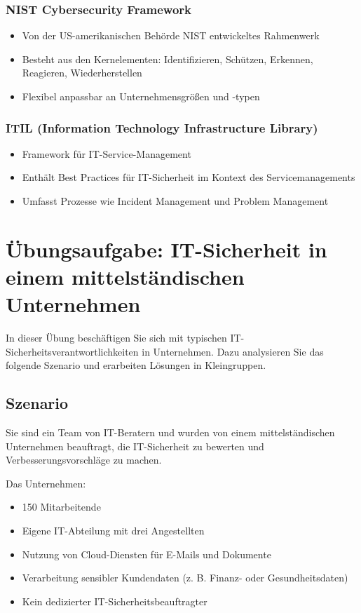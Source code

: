 \documentclass{orgstandard}
\begin{document}
\subsubsection{NIST Cybersecurity Framework}
\label{sec:orgc2ca827}
\begin{itemize}
\item Von der US-amerikanischen Behörde NIST entwickeltes Rahmenwerk
\item Besteht aus den Kernelementen: Identifizieren, Schützen, Erkennen, Reagieren, Wiederherstellen
\item Flexibel anpassbar an Unternehmensgrößen und -typen
\end{itemize}
\subsubsection{ITIL (Information Technology Infrastructure Library)}
\label{sec:org27d10a5}
\begin{itemize}
\item Framework für IT-Service-Management
\item Enthält Best Practices für IT-Sicherheit im Kontext des Servicemanagements
\item Umfasst Prozesse wie Incident Management und Problem Management
\end{itemize}
\section{Übungsaufgabe: IT-Sicherheit in einem mittelständischen Unternehmen}
\label{sec:orgc2ade00}
In dieser Übung beschäftigen Sie sich mit typischen IT-Sicherheitsverantwortlichkeiten in Unternehmen. 
Dazu analysieren Sie das folgende Szenario und erarbeiten Lösungen in Kleingruppen.
\subsection{Szenario}
\label{sec:org21960e6}

Sie sind ein Team von IT-Beratern und wurden von einem mittelständischen Unternehmen beauftragt, 
die IT-Sicherheit zu bewerten und Verbesserungsvorschläge zu machen. 

Das Unternehmen:
\begin{itemize}
\item 150 Mitarbeitende
\item Eigene IT-Abteilung mit drei Angestellten
\item Nutzung von Cloud-Diensten für E-Mails und Dokumente
\item Verarbeitung sensibler Kundendaten (z. B. Finanz- oder Gesundheitsdaten)
\item Kein dedizierter IT-Sicherheitsbeauftragter
\end{itemize}
\end{document}

